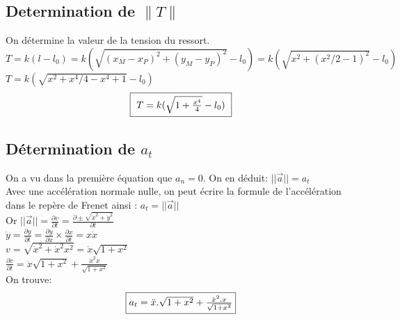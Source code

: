 \documentclass[10pt,a4paper]{article}
\begin{document}
\subsection{Determination de $ \|T\| $}
On détermine la valeur de la tension du ressort.\\
$T=k(l-l_0)=k(\sqrt{(x_M-x_P)^2+(y_M-y_P)^2}-l_0)=k(\sqrt{x^2+(x^2/2-1)^2}-l_0)$\\
$T=k(\sqrt{x^2+x^4/4-x^4+1}-l_0)$\\
\[\fbox{ $T=k(\sqrt{1+\frac{x^4}{4}}-l_0)$ }\]

\subsection{Détermination de $a_t$}
On a vu dans la première équation que $a_n=0$. On en déduit: $||\vec{a}||=a_t$\\
Avec une accélération normale nulle, on peut écrire la formule de l'accélération dans le repère de Frenet ainsi : $a_t=||\vec{a}||$\\ %
Or $||\vec{a}||=\frac{\partial v}{\partial t}=\frac{\partial \pm\sqrt{\dot{x}^2+\dot{y}^2}}{\partial t}$\\
$ \dot{y}=\frac{\partial y}{\partial t}=\frac{\partial y}{\partial x}\times\frac{\partial x}{\partial t}=x\dot{x} $\\
$ v=\sqrt{\dot{x}^2+\dot{x}^2x^2}=\dot{x}\sqrt{1+x^2} $\\
$ \frac{\partial v}{\partial t}=\ddot{x}\sqrt{1+x^2}+\frac{\dot{x}^2x}{\sqrt{1+x^2}} $\\
On trouve: \[\fbox{$a_t=\ddot{x}.\sqrt{1+x^2}+ \frac{\dot{x}^2.x}{\sqrt{1+x^2}}$}\]
\end{document}

